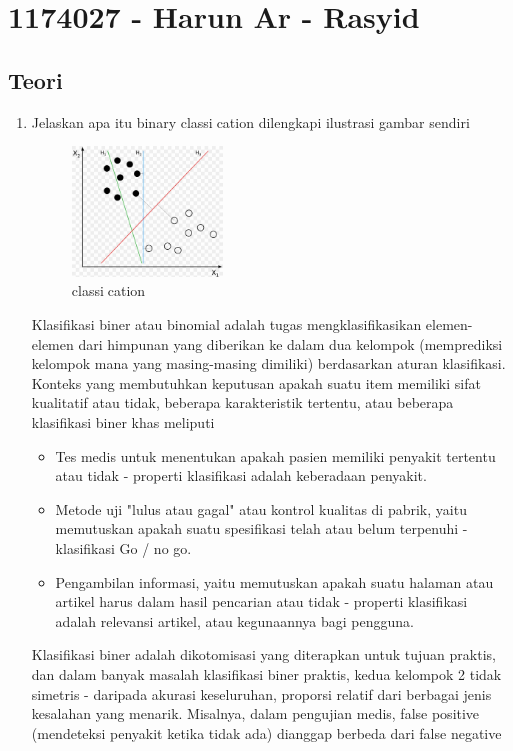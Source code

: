 \section{1174027 - Harun Ar - Rasyid}
\subsection{Teori}
\begin{enumerate}
	\item Jelaskan apa itu binary classication dilengkapi ilustrasi gambar sendiri
	\hfill\break
	\begin{figure}[H]
		\includegraphics[width=4cm]{figures/1174027/2/1.jpg}
		\centering
		\caption{classication}
	\end{figure}
	Klasifikasi biner atau binomial adalah tugas mengklasifikasikan elemen-elemen dari himpunan yang diberikan ke dalam dua kelompok (memprediksi kelompok mana yang masing-masing dimiliki) berdasarkan aturan klasifikasi. 
	Konteks yang membutuhkan keputusan apakah suatu item memiliki sifat kualitatif atau tidak, beberapa karakteristik tertentu, atau beberapa klasifikasi biner khas meliputi
	\begin{itemize}
		\item Tes medis untuk menentukan apakah pasien memiliki penyakit tertentu atau tidak - properti klasifikasi adalah keberadaan penyakit.
		\item Metode uji "lulus atau gagal" atau kontrol kualitas di pabrik, yaitu memutuskan apakah suatu spesifikasi telah atau belum terpenuhi - klasifikasi Go / no go.
		\item Pengambilan informasi, yaitu memutuskan apakah suatu halaman atau artikel harus dalam hasil pencarian atau tidak - properti klasifikasi adalah relevansi artikel, atau kegunaannya bagi pengguna.
	\end{itemize}
	\hfill\break
	Klasifikasi biner adalah dikotomisasi yang diterapkan untuk tujuan praktis, dan dalam banyak masalah klasifikasi biner praktis, 
	kedua kelompok 2 tidak simetris - daripada akurasi keseluruhan, proporsi relatif dari berbagai jenis kesalahan yang menarik. 
	Misalnya, dalam pengujian medis, false positive (mendeteksi penyakit ketika tidak ada) dianggap berbeda dari false negative 

\end{enumerate}
